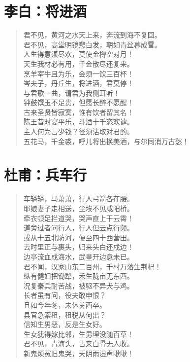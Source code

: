 \documentclass[12pt,oneside]{book}
\newenvironment{shici}{%
\begin{verse}\centering\yanti\large\hspace{12pt}}{\end{verse}}
\begin{document}
\begin{common-format}
\chapter{李白：将进酒}
\begin{shici}
君不见，黄河之水天上来，奔流到海不复回。\\
君不见，高堂明镜悲白发，朝如青丝暮成雪。\\
人生得意须尽欢，莫使金樽空对月！\\
天生我材必有用，千金散尽还复来。\\
烹羊宰牛且为乐，会须一饮三百杯！\\
岑夫子，丹丘生，将进酒，君莫停！\\
与君歌一曲，请君为我侧耳听！\\
钟鼓馔玉不足贵，但愿长醉不愿醒！\\
古来圣贤皆寂寞，惟有饮者留其名！\\
陈王昔时宴平乐，斗酒十千恣欢谑。\\
主人何为言少钱？径须沽取对君酌。\\
五花马，千金裘，呼儿将出换美酒，与尔同消万古愁！
\end{shici}

\chapter{杜甫：兵车行}
\begin{shici}
车辚辚，马萧萧，行人弓箭各在腰。\\
耶娘妻子走相送，尘埃不见咸阳桥。\\
牵衣顿足拦道哭，哭声直上干云霄！\\
道旁过者问行人，行人但云点行频。\\
或从十五北防河，便至四十西营田。\\
去时里正与裹头，归来头白还戍边！\\
边亭流血成海水，武皇开边意未已。\\
君不闻，汉家山东二百州，千村万落生荆杞！\\
纵有健妇把锄犁，禾生陇亩无东西。\\
况复秦兵耐苦战，被驱不异犬与鸡。\\
长者虽有问，役夫敢申恨？\\
且如今年冬，未休关西卒。\\
县官急索租，租税从何出？\\
信知生男恶，反是生女好。\\
生女犹得嫁比邻，生男埋没随百草！\\
君不见，青海头，古来白骨无人收。\\
新鬼烦冤旧鬼哭，天阴雨湿声啾啾！
\end{shici}


\end{common-format}
\end{document}

